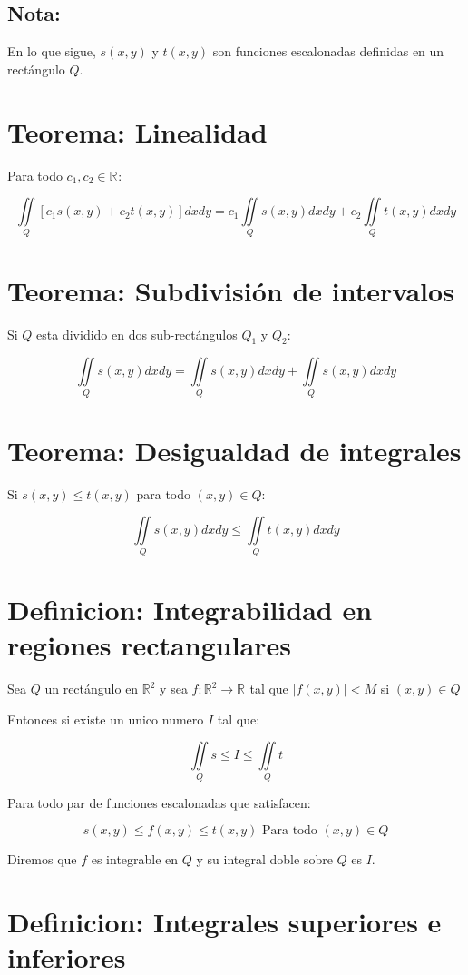 \documentclass[12pt]{article}
\newcommand{\teorema}[1]{\section{Teorema: #1}}
\newcommand{\definicion}[1]{\section{Definicion: #1}}
\newcommand{\R}[1]{\mathbb{R}^{#1}}
\begin{document}
	\subsection*{Nota:}
	
	En lo que sigue, $s(x,y)$ y $t(x,y)$ son funciones escalonadas definidas en un rectángulo $Q$.
	
	\teorema{Linealidad}
	
	Para todo $c_1,c_2 \in \R{}:$
	
	\begin{equation}
		\iint\limits_Q [c_1 s(x,y) + c_2 t(x,y)]dxdy = c_1 \iint\limits_Q s(x,y)dxdy + c_2 \iint\limits_Q t(x,y)dxdy
	\end{equation}
	
	\teorema{Subdivisión de intervalos}
	
	Si $Q$ esta dividido en dos sub-rectángulos $Q_1$ y $Q_2$:
	
	\begin{equation}
		\iint\limits_Q s(x,y)dxdy = \iint\limits_Q s(x,y)dxdy + \iint\limits_Q s(x,y)dxdy
	\end{equation}

	\teorema{Desigualdad de integrales}
	
	Si $s(x,y) \leq t(x,y)$ para todo $(x,y) \in Q$:
	
	\begin{equation}
		\iint\limits_Q s(x,y)dxdy \leq \iint\limits_Q t(x,y)dxdy
	\end{equation}
	
	\definicion{Integrabilidad en regiones rectangulares}
	
	Sea $Q$ un rectángulo en $\R{2}$ y sea $f:\R{2} \rightarrow \R{}$ tal que $|f(x,y)| < M$ si $(x,y) \in Q$
	
	Entonces si existe un unico numero $I$ tal que:
	
	\begin{equation}
		\iint\limits_Q s \leq I \leq \iint\limits_Q t
	\end{equation}
	
	Para todo par de funciones escalonadas que satisfacen:
	
	\begin{equation}
		s(x,y) \leq f(x,y) \leq t(x,y) \text{ Para todo } (x,y) \in Q
	\end{equation}
	
	Diremos que $f$ es integrable en $Q$ y su integral doble sobre $Q$ es $I$.
	
	\definicion{Integrales superiores e inferiores}
	
\end{document}
